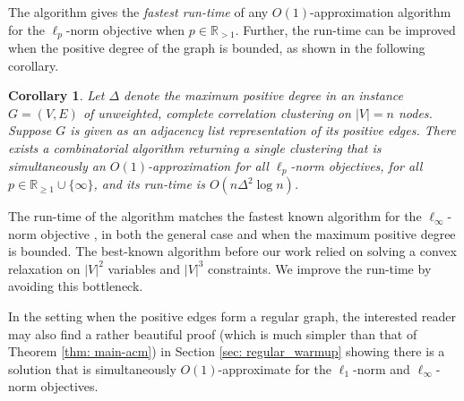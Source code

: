 \documentclass[11pt]{article}
\newtheorem{corollary}{Corollary}
\begin{document}
The algorithm gives the \emph{fastest run-time} of any $O(1)$-approximation algorithm for the $\ell_p$-norm objective when $p  \in \mathbb{R}_{>1}$.
Further, the run-time can be improved  when the positive degree of the graph is bounded, as shown in the following corollary. 

\begin{corollary}\label{cor: main-acm-sparse}
Let $\Delta$ denote the maximum positive degree in an instance $G=(V,E)$ of unweighted, complete correlation clustering on $|V|=n$ nodes. Suppose $G$ is given as an adjacency list representation of its positive edges. There exists a combinatorial algorithm returning a single clustering that is simultaneously an $O(1)$-approximation for all $\ell_p$-norm objectives, for all $p\in \mathbb{R}_{\geq 1} \cup \{\infty\}$, and its run-time is $O(n\Delta^2 \log n)$.
\end{corollary}

The run-time of the algorithm matches the fastest known algorithm for the $\ell_\infty$-norm objective \cite{DMN23}, 
in both the general case and when the maximum positive degree is bounded.
The best-known algorithm before our work relied on solving a convex relaxation on $|V|^2$ variables and $|V|^3$ constraints.
We improve the run-time by avoiding this bottleneck.

In the setting when the positive edges form a regular graph, 
the interested reader may also find a rather beautiful proof (which is much simpler than that of Theorem \ref{thm: main-acm}) in Section \ref{sec: regular_warmup} showing there is a solution that is simultaneously $O(1)$-approximate for the $\ell_1$-norm and $\ell_{\infty}$-norm objectives.
\end{document}
